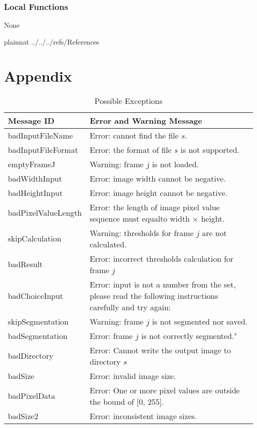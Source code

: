 \documentclass[12pt, titlepage]{article}
\begin{document}
\subsubsection{Local Functions}

None

\newpage

 {plainnat}
 {../../../refs/References}

\newpage

\section{Appendix} \label{Appendix}

\renewcommand{\arraystretch}{1.2}

\begin{longtable}{l p{12cm}}
\caption{Possible Exceptions} \\
\toprule
\textbf{Message ID} & \textbf{Error and Warning Message} \\
\midrule
badInputFileName & Error: cannot find the file $s$.\\ badInputFileFormat &
Error: the format of file $s$ is not supported.\\
emptyFrameJ & Warning: frame $j$ is not loaded.\\
badWidthInput & Error: image width cannot be negative.\\
badHeightInput & Error: image height cannot be negative.\\
badPixelValueLength & Error: the length of image pixel value sequence must
equalto width $\times$ height.\\
skipCalculation & Warning: thresholds for frame $j$ are not calculated.\\
badResult & Error: incorrect thresholds calculation for frame $j$\\
badChoiceInput & Error: input is not a number from the set, please read the
following instructions carefully and try again:\\
skipSegmentation & Warning: frame $j$ is not segmented nor saved.\\
badSegmentation & Error: frame $j$ is not correctly segmented."\\
badDirectory & Error: Cannot write the output image to directory $s$\\
badSize & Error: invalid image size.\\
badPixelData & Error: One or more pixel values are outside the bound of [0,
255].\\
badSize2 & Error: inconsistent image sizes.\\
\bottomrule
\end{longtable}
\end{document}
